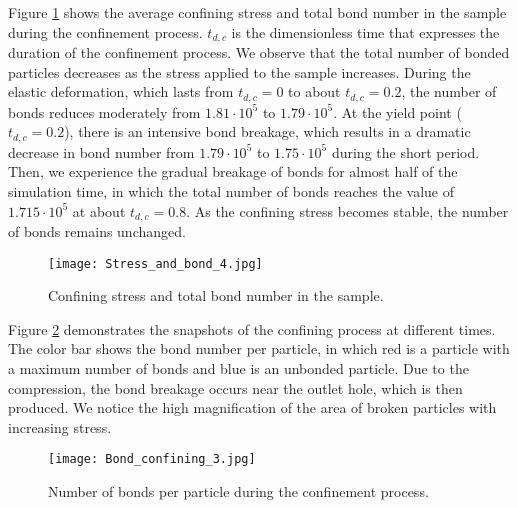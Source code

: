 \documentclass{article}
\begin{document}
Figure \ref{fig:Stress_and_bond} shows the average confining stress and total bond number in the sample during the confinement process. $t_{d, c}$ is the dimensionless time that expresses the duration of the confinement process. We observe that the total number of bonded particles decreases as the stress applied to the sample increases. During the elastic deformation, which lasts from $t_{d, c} = 0$ to about $t_{d, c}  = 0.2 $, the number of bonds reduces moderately from $1.81 \cdot 10^{5} $ to $1.79 \cdot 10^{5} $. At the yield point ($t_{d, c} = 0.2 $), there is an intensive bond breakage, which results in a dramatic decrease in bond number from $1.79 \cdot 10^{5} $ to $1.75 \cdot 10^{5} $ during the short period. Then, we experience the gradual breakage of bonds for almost half of the simulation time, in which the total number of bonds reaches the value of $1.715 \cdot 10^{5} $ at about $t_{d, c} = 0.8 $. As the confining stress becomes stable, the number of bonds remains unchanged.

 \begin{figure}[H]
\begin{centering}
\texttt{[image: Stress\_and\_bond\_4.jpg]}
\par\end{centering}
\caption{Confining stress and total bond number in the sample.\label{fig:Stress_and_bond}}
\end{figure}

Figure \ref{fig:bond_conf} demonstrates the snapshots of the confining process at different times. The color bar shows the bond number per particle, in which red is a particle with a maximum number of bonds and blue is an unbonded particle. Due to the compression, the bond breakage occurs near the outlet hole, which is then produced. We notice the high magnification of the area of broken particles with increasing stress.

 \begin{figure}[H]
\begin{centering}
\texttt{[image: Bond\_confining\_3.jpg]}
\par\end{centering}
\caption{Number of bonds per particle during the confinement process.\label{fig:bond_conf}}
\end{figure}
\end{document}
